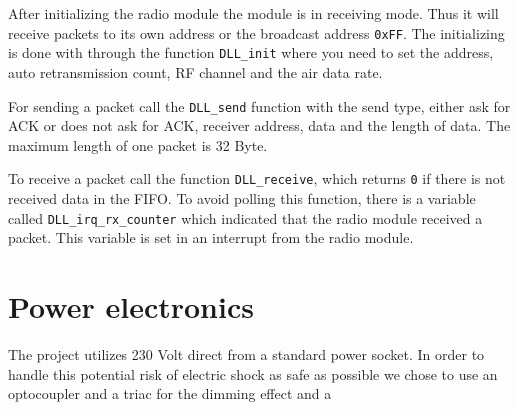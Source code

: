 \documentclass[11pt]{article}
\begin{document}
   After initializing the radio module the module is in receiving mode. Thus it will receive packets to its own address or the broadcast address \texttt{0xFF}. The initializing is done with through the function \texttt{DLL\_init} where you need to set the address, auto retransmission count, RF channel and the air data rate.
   
   For sending a packet call the \texttt{DLL\_send} function with the send type, either ask for ACK or does not ask for ACK, receiver address, data and the length of data. The maximum length of one packet is 32 Byte.
   
   To receive a packet call the function \texttt{DLL\_receive}, which returns \texttt{0} if there is not received data in the FIFO. To avoid polling this function, there is a variable called \texttt{DLL\_irq\_rx\_counter} which indicated that the radio module received a packet. This variable is set in an interrupt from the radio module.
   
     \section{Power electronics}
     The project utilizes 230 Volt direct from a standard power socket. In order to handle this potential risk of electric shock as safe as possible we chose to use an optocoupler and a triac for the dimming effect and a 
\end{document}
